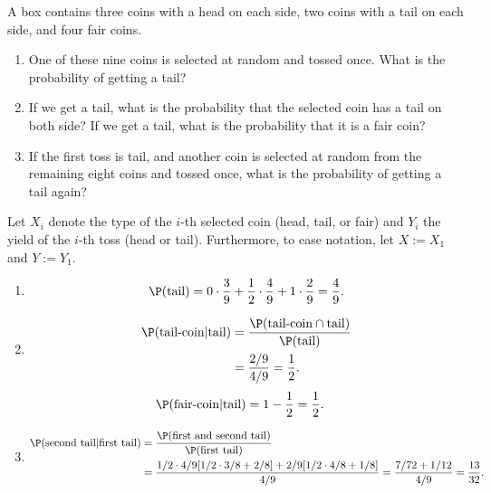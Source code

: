 
\begin{exercise}

A box contains three coins with a head on each side, two coins with a tail on each side, and four fair coins.

\begin{enumerate}[label = (\alph*)]

    \item One of these nine coins is selected at random and tossed once.
    What is the probability of getting a tail?

    \item If we get a tail, what is the probability that the selected coin has a tail on both side?
    If we get a tail, what is the probability that it is a fair coin?

    \item If the first toss is tail, and another coin is selected at random from the remaining eight coins and tossed once, what is the probability of getting a tail again?

\end{enumerate}

\end{exercise}


\begin{solution}

Let $X_i$ denote the type of the $i$-th selected coin (head, tail, or fair) and $Y_i$ the yield of the $i$-th toss (head or tail).
Furthermore, to ease notation, let $X := X_1$ and $Y := Y_1$.

\begin{enumerate}[label = (\alph*)]

\item
\begin{align*}
  \P(\text{tail}) = 0\cdot\frac{3}{9} + \frac{1}{2}\cdot\frac{4}{9} + 1\cdot\frac{2}{9} = \frac{4}{9}.
\end{align*}
\item
\begin{align*}
  \P(\text{tail-coin}|\text{tail}) &=
  \frac{\P(\text{tail-coin} \cap \text{tail})}{\P(\text{tail})} \\
  &= \frac{2/9}{4/9} = \frac{1}{2}.
\end{align*}
\begin{align*}
  \P(\text{fair-coin}|\text{tail}) &= 1 - \frac{1}{2} = \frac{1}{2}.
\end{align*}
\item
\begin{align*}
  \P(\text{second tail}|\text{first tail})
  &= \frac{\P(\text{first and second tail})}{\P(\text{first tail})} \\
  &= \frac{1/2\cdot4/9[1/2\cdot3/8 + 2/8] + 2/9[1/2\cdot4/8 + 1/8]}{4/9}
  = \frac{7/72 + 1/12}{4/9} = \frac{13}{32}.
\end{align*}
\end{enumerate}

\end{solution}

